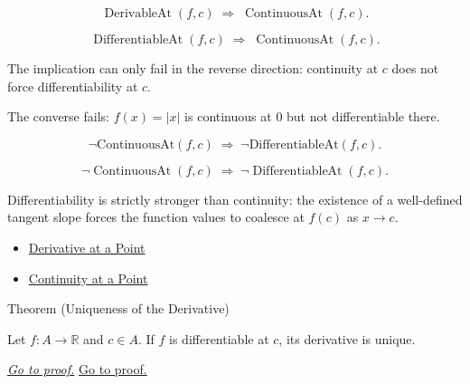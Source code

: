 \begin{remark*}
\[
\operatorname{DerivableAt}(f,c) \;\Rightarrow\; \operatorname{ContinuousAt}(f,c).
\]
\end{remark*}

\begin{remark*}
\[
\operatorname{DifferentiableAt}(f,c)
\;\Longrightarrow\;
\operatorname{ContinuousAt}(f,c).
\]
\end{remark*}

\begin{remark*}
The implication can only fail in the reverse direction: continuity at $c$
does not force differentiability at $c$.
\end{remark*}

\begin{remark*}
The converse fails: $f(x) = |x|$ is continuous at $0$ but not differentiable there.
\end{remark*}

\begin{remark*}
\[
\neg \text{ContinuousAt}(f,c) \;\Rightarrow\; \neg \text{DifferentiableAt}(f,c).
\]
\end{remark*}

\begin{remark*}
\[
\neg\operatorname{ContinuousAt}(f,c)
\;\Longrightarrow\;
\neg\operatorname{DifferentiableAt}(f,c).
\]
\end{remark*}

\begin{remark*}[Interpretation]
Differentiability is strictly stronger than continuity: the existence of a well-defined tangent slope forces the function values to coalesce at $f(c)$ as $x \to c$.
\end{remark*}

\begin{dependencies}
\begin{itemize}
  \item \hyperref[def:derivative-at-a-point]{Derivative at a Point}
  \item \hyperref[def:continuous-at-point]{Continuity at a Point}
\end{itemize}
\end{dependencies}


\begin{theorembox}{Theorem (Uniqueness of the Derivative)}
\begin{theorem}
\label{thm:uniqueness-of-the-derivative}
Let $f : A \to \mathbb{R}$ and $c \in A$. If $f$ is differentiable at $c$, its derivative is unique.

\smallskip\noindent
\hyperref[prf:uniqueness-of-the-derivative]{\textit{Go to proof.}}
\hyperref[prf:uniqueness-of-the-derivative]{Go to proof.}
\end{theorem}
\end{theorembox}

